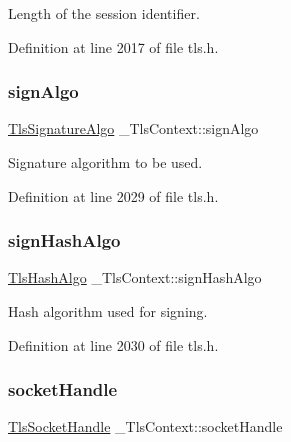 Length of the session identifier. 



Definition at line 2017 of file tls.\+h.

\mbox{\label{struct__TlsContext_aac060e84dca11de2709484e429e0320a}} 
\subsubsection{\texorpdfstring{sign\+Algo}{signAlgo}}
{\footnotesize\ttfamily \hyperlink{tls_8h_abe6ce436cb0d777df29e0af7bf800223}{Tls\+Signature\+Algo} \+\_\+\+Tls\+Context\+::sign\+Algo}



Signature algorithm to be used. 



Definition at line 2029 of file tls.\+h.

\mbox{\label{struct__TlsContext_ab9cd4342a2e92de65a1b5de453f092a7}} 
\subsubsection{\texorpdfstring{sign\+Hash\+Algo}{signHashAlgo}}
{\footnotesize\ttfamily \hyperlink{tls_8h_a98b0299cd7e197edc67123642089156d}{Tls\+Hash\+Algo} \+\_\+\+Tls\+Context\+::sign\+Hash\+Algo}



Hash algorithm used for signing. 



Definition at line 2030 of file tls.\+h.

\mbox{\label{struct__TlsContext_a24c3e8a0d8a4d920767b1d76927bd670}} 
\subsubsection{\texorpdfstring{socket\+Handle}{socketHandle}}
{\footnotesize\ttfamily \hyperlink{tls_8h_a55c0b32d3441cc70d62c51951ccaaa4e}{Tls\+Socket\+Handle} \+\_\+\+Tls\+Context\+::socket\+Handle}



